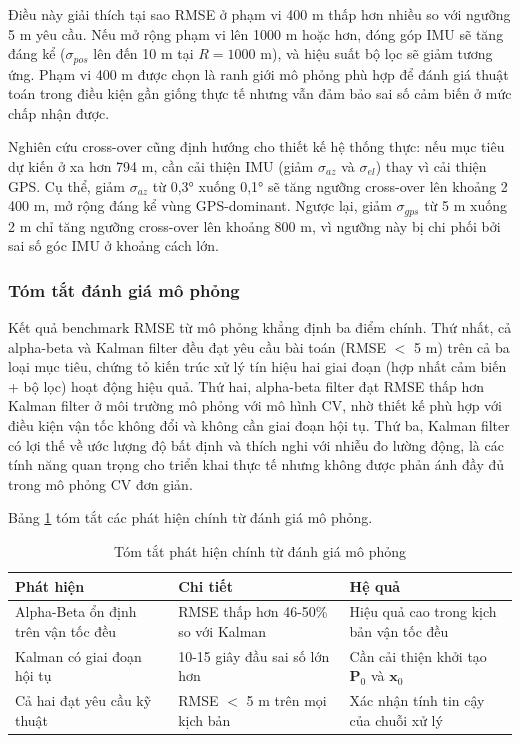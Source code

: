 Điều này giải thích tại sao RMSE ở phạm vi 400 m thấp hơn nhiều so với ngưỡng 5 m yêu cầu. Nếu mở rộng phạm vi lên 1000 m hoặc hơn, đóng góp IMU sẽ tăng đáng kể ($\sigma_{pos}$ lên đến 10 m tại $R = 1000$ m), và hiệu suất bộ lọc sẽ giảm tương ứng. Phạm vi 400 m được chọn là ranh giới mô phỏng phù hợp để đánh giá thuật toán trong điều kiện gần giống thực tế nhưng vẫn đảm bảo sai số cảm biến ở mức chấp nhận được.

Nghiên cứu cross-over cũng định hướng cho thiết kế hệ thống thực: nếu mục tiêu dự kiến ở xa hơn 794 m, cần cải thiện IMU (giảm $\sigma_{az}$ và $\sigma_{el}$) thay vì cải thiện GPS. Cụ thể, giảm $\sigma_{az}$ từ 0,3° xuống 0,1° sẽ tăng ngưỡng cross-over lên khoảng 2 400 m, mở rộng đáng kể vùng GPS-dominant. Ngược lại, giảm $\sigma_{gps}$ từ 5 m xuống 2 m chỉ tăng ngưỡng cross-over lên khoảng 800 m, vì ngưỡng này bị chi phối bởi sai số góc IMU ở khoảng cách lớn.

\subsubsection{Tóm tắt đánh giá mô phỏng}

\hspace{0.5cm} Kết quả benchmark RMSE từ mô phỏng khẳng định ba điểm chính. Thứ nhất, cả alpha-beta và Kalman filter đều đạt yêu cầu bài toán (RMSE $<$ 5 m) trên cả ba loại mục tiêu, chứng tỏ kiến trúc xử lý tín hiệu hai giai đoạn (hợp nhất cảm biến + bộ lọc) hoạt động hiệu quả. Thứ hai, alpha-beta filter đạt RMSE thấp hơn Kalman filter ở môi trường mô phỏng với mô hình CV, nhờ thiết kế phù hợp với điều kiện vận tốc không đổi và không cần giai đoạn hội tụ. Thứ ba, Kalman filter có lợi thế về ước lượng độ bất định và thích nghi với nhiễu đo lường động, là các tính năng quan trọng cho triển khai thực tế nhưng không được phản ánh đầy đủ trong mô phỏng CV đơn giản.



Bảng \ref{tab:summary-week4} tóm tắt các phát hiện chính từ đánh giá mô phỏng.

\begin{table}[H]
\centering
\caption{Tóm tắt phát hiện chính từ đánh giá mô phỏng}
\label{tab:summary-week4}
\begin{tabularx}{\linewidth}{lXX}
\toprule
\textbf{Phát hiện} & \textbf{Chi tiết} & \textbf{Hệ quả} \\
\midrule
Alpha-Beta ổn định trên vận tốc đều & RMSE thấp hơn 46-50\% so với Kalman & Hiệu quả cao trong kịch bản vận tốc đều \\
Kalman có giai đoạn hội tụ & 10-15 giây đầu sai số lớn hơn & Cần cải thiện khởi tạo $\mathbf{P}_0$ và $\mathbf{x}_0$ \\
Cả hai đạt yêu cầu kỹ thuật & RMSE $<$ 5 m trên mọi kịch bản & Xác nhận tính tin cậy của chuỗi xử lý \\
\bottomrule
\end{tabularx}
\end{table}

